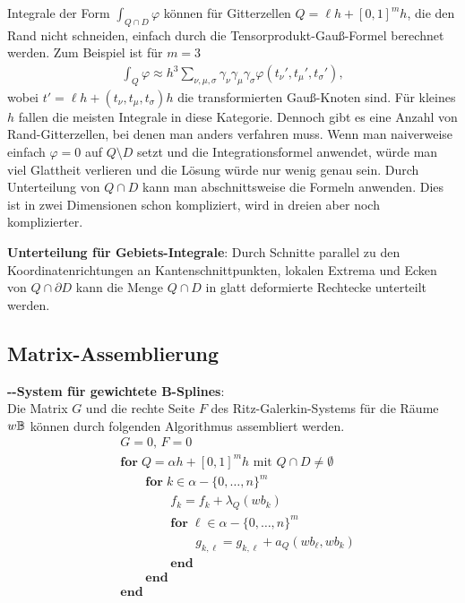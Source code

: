 Integrale der Form $\int_{Q \cap D} \varphi$ können für Gitterzellen $Q = \ell h + [0, 1]^m h$,
die den Rand nicht schneiden, einfach durch die Tensorprodukt-Gauß-Formel berechnet werden.
Zum Beispiel ist für $m = 3$
\begin{align*}
    \int_Q \varphi
    \approx h^3 \sum_{\nu,\mu,\sigma} \gamma_\nu \gamma_\mu \gamma_\sigma
    \varphi(t_\nu', t_\mu', t_\sigma'),
\end{align*}
wobei $t' = \ell h + (t_\nu, t_\mu, t_\sigma) h$ die transformierten Gauß-Knoten sind.
Für kleines $h$ fallen die meisten Integrale in diese Kategorie.
Dennoch gibt es eine Anzahl von Rand-Gitterzellen, bei denen man anders verfahren muss.
Wenn man naiverweise einfach $\varphi = 0$ auf $Q \setminus D$ setzt und die Integrationsformel
anwendet, würde man viel Glattheit verlieren und die Lösung würde nur wenig genau sein.
Durch Unterteilung von $Q \cap D$ kann man abschnittsweise die Formeln anwenden.
Dies ist in zwei Dimensionen schon kompliziert, wird in dreien aber noch komplizierter.

\textbf{Unterteilung für Gebiets-Integrale}:
Durch Schnitte parallel zu den Koordinatenrichtungen an Kantenschnittpunkten,
lokalen Extrema und Ecken von $Q \cap \partial D$ kann die Menge $Q \cap D$ in
glatt deformierte Rechtecke unterteilt werden.

\pagebreak

\subsection{%
    Matrix-Assemblierung%
}

\textbf{--System für gewichtete B-Splines}:\\
Die Matrix $G$ und die rechte Seite $F$ des Ritz-Galerkin-Systems für die Räume $w\mathbb{B}$
können durch folgenden Algorithmus assembliert werden.
\begin{align*}
    &G = 0,\, F = 0\\
    &\mathbf{for}\; Q = \alpha h + [0, 1]^m h \text{ mit } Q \cap D \not= \emptyset\\
    &\qquad\mathbf{for}\; k \in \alpha - \{0, \dotsc, n\}^m\\
    &\qquad\qquad f_k = f_k + \lambda_Q(w b_k)\\
    &\qquad\qquad\mathbf{for}\; \ell \in \alpha - \{0, \dotsc, n\}^m\\
    &\qquad\qquad\qquad g_{k,\ell} = g_{k,\ell} + a_Q(w b_\ell, w b_k)\\
    &\qquad\qquad\mathbf{end}\\
    &\qquad\mathbf{end}\\
    &\mathbf{end}
\end{align*}

